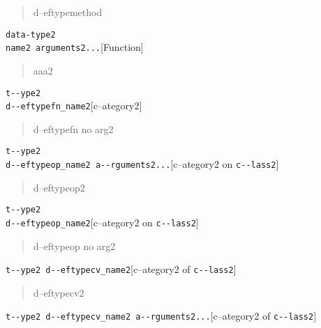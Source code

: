 \documentclass{book}
\begin{document}
%
\begin{quote}
d--eftypemethod
\end{quote}


\noindent\texttt{data-type2\leavevmode{}\\name2 arguments2...}\hfill[Function]



%
\begin{quote}
aaa2
\end{quote}

\noindent\texttt{t{-}{-}ype2\leavevmode{}\\d{-}{-}eftypefn\_name2}\hfill[c--ategory2]



%
\begin{quote}
d--eftypefn no arg2
\end{quote}

\noindent\texttt{t{-}{-}ype2\leavevmode{}\\d{-}{-}eftypeop\_name2 a{-}{-}rguments2...}\hfill[c--ategory2 on \texttt{c{-}{-}lass2}]



%
\begin{quote}
d--eftypeop2
\end{quote}

\noindent\texttt{t{-}{-}ype2\leavevmode{}\\d{-}{-}eftypeop\_name2}\hfill[c--ategory2 on \texttt{c{-}{-}lass2}]



%
\begin{quote}
d--eftypeop no arg2
\end{quote}

\noindent\texttt{t{-}{-}ype2 d{-}{-}eftypecv\_name2}\hfill[c--ategory2 of \texttt{c{-}{-}lass2}]



%
\begin{quote}
d--eftypecv2
\end{quote}

\noindent\texttt{t{-}{-}ype2 d{-}{-}eftypecv\_name2 a{-}{-}rguments2...}\hfill[c--ategory2 of \texttt{c{-}{-}lass2}]
\end{document}
